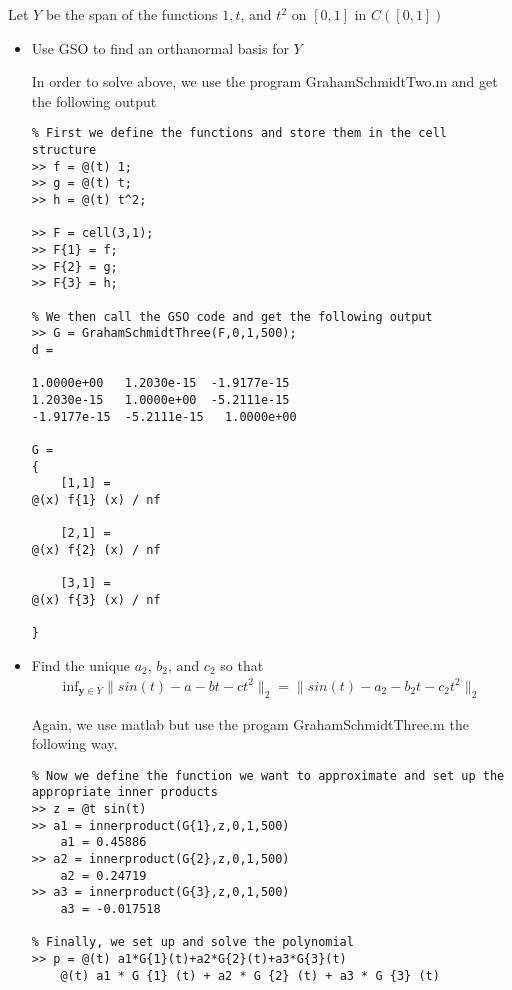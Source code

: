 \documentclass[11pt]{SelfArxOneColBMN}
\begin{document}
\begin{exercise}
    Let $Y$ be the span of the functions $1, t$, and $t^2$ on $[0,1]$ in $C([0,1])$
    \begin{itemize}
        \item Use GSO to find an orthanormal basis for $Y$
        \begin{solution}
            In order to solve above, we use the program GrahamSchmidtTwo.m and get the following output
\begin{lstlisting}
% First we define the functions and store them in the cell structure
>> f = @(t) 1;
>> g = @(t) t;
>> h = @(t) t^2;

>> F = cell(3,1);
>> F{1} = f;
>> F{2} = g;
>> F{3} = h;

% We then call the GSO code and get the following output
>> G = GrahamSchmidtThree(F,0,1,500);
d = 

1.0000e+00   1.2030e-15  -1.9177e-15
1.2030e-15   1.0000e+00  -5.2111e-15
-1.9177e-15  -5.2111e-15   1.0000e+00

G =
{
    [1,1] =
@(x) f{1} (x) / nf

    [2,1] =
@(x) f{2} (x) / nf

    [3,1] =
@(x) f{3} (x) / nf

}
\end{lstlisting}
\lstset{fancyvrb=false}
        \end{solution}
        \item Find the unique $a_2$, $b_2$, and $c_2$ so that
        \begin{eqnarray*}
            \text{inf}_{\mathbf{y} \in Y}\|sin(t) - a - bt - ct^2\|_2 = \|sin(t) - a_2 - b_2t - c_2t^2\|_2
        \end{eqnarray*}
        \begin{solution}
            Again, we use matlab but use the progam GrahamSchmidtThree.m the following way.\\
\begin{lstlisting}
% Now we define the function we want to approximate and set up the appropriate inner products
>> z = @t sin(t)
>> a1 = innerproduct(G{1},z,0,1,500)
    a1 = 0.45886
>> a2 = innerproduct(G{2},z,0,1,500)
    a2 = 0.24719
>> a3 = innerproduct(G{3},z,0,1,500)
    a3 = -0.017518

% Finally, we set up and solve the polynomial
>> p = @(t) a1*G{1}(t)+a2*G{2}(t)+a3*G{3}(t)
    @(t) a1 * G {1} (t) + a2 * G {2} (t) + a3 * G {3} (t)


\end{lstlisting}
\end{solution}
\end{itemize}
\end{exercise}
\end{document}
